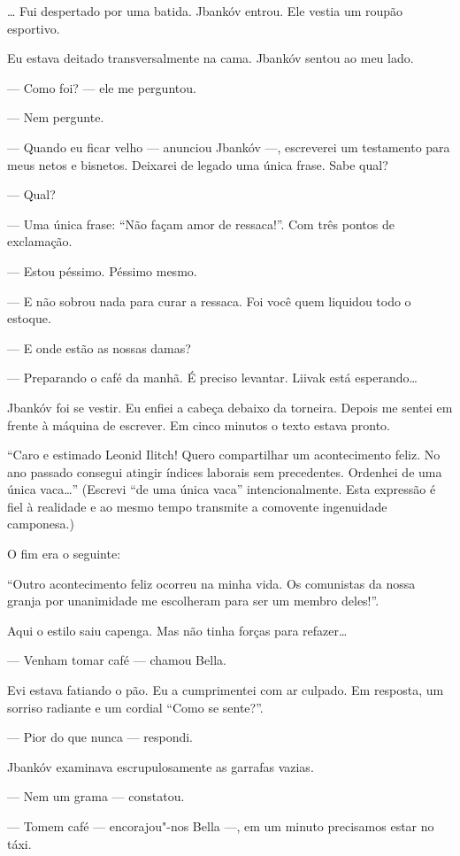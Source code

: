 \ldots{} Fui despertado por uma batida. Jbankóv entrou. Ele vestia um roupão
esportivo.

Eu estava deitado transversalmente na cama. Jbankóv sentou ao meu lado.

--- Como foi? --- ele me perguntou.

--- Nem pergunte.

--- Quando eu ficar velho --- anunciou Jbankóv ---,
escreverei um testamento para meus netos e bisnetos. Deixarei de legado
uma única frase. Sabe qual?

--- Qual?

--- Uma única frase: ``Não façam amor de ressaca!''. Com três
pontos de exclamação.

--- Estou péssimo. Péssimo mesmo.

--- E não sobrou nada para curar a ressaca. Foi você quem
liquidou todo o estoque.

--- E onde estão as nossas damas?

--- Preparando o café da manhã. É preciso levantar. Liivak
está esperando\ldots{}

Jbankóv foi se vestir. Eu enfiei a cabeça debaixo da torneira. Depois me
sentei em frente à máquina de escrever. Em cinco minutos o texto estava
pronto.

``Caro e estimado Leonid Ilitch! Quero compartilhar um acontecimento
feliz. No ano passado consegui atingir índices laborais sem precedentes.
Ordenhei de uma única vaca\ldots{}'' (Escrevi ``de uma única vaca''
intencionalmente. Esta expressão é fiel à realidade e ao mesmo tempo
transmite a comovente ingenuidade camponesa.)

O fim era o seguinte:

``Outro acontecimento feliz ocorreu na minha vida. Os comunistas da
nossa granja por unanimidade me escolheram para ser um membro deles!''.

Aqui o estilo saiu capenga. Mas não tinha forças para refazer\ldots{}

--- Venham tomar café --- chamou Bella.

Evi estava fatiando o pão. Eu a cumprimentei com ar culpado. Em
resposta, um sorriso radiante e um cordial ``Como se sente?''.

--- Pior do que nunca --- respondi.

Jbankóv examinava escrupulosamente as garrafas vazias.

--- Nem um grama --- constatou.

--- Tomem café --- encorajou"-nos Bella ---, em um
minuto precisamos estar no táxi.

